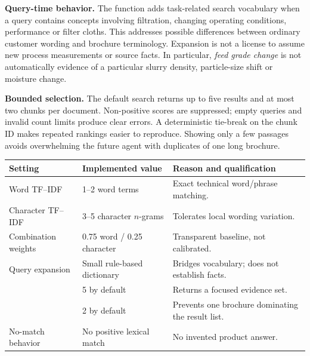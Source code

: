 \documentclass[11pt,a4paper]{article}
\DeclareRobustCommand{\code}[1]{{\ttfamily\small\detokenize{#1}}}
\begin{document}
\textbf{Query-time behavior.} The function \code{expand_query()} adds task-related search vocabulary when a query contains concepts involving filtration, changing operating conditions, performance or filter cloths. This addresses possible differences between ordinary customer wording and brochure terminology. Expansion is not a license to assume new process measurements or source facts. In particular, \emph{feed grade change} is not automatically evidence of a particular slurry density, particle-size shift or moisture change.

\textbf{Bounded selection.} The default search returns up to five results and at most two chunks per document. Non-positive scores are suppressed; empty queries and invalid count limits produce clear errors. A deterministic tie-break on the chunk ID makes repeated rankings easier to reproduce. Showing only a few passages avoids overwhelming the future agent with duplicates of one long brochure.

\begin{tabularx}{\textwidth}{@{}L{45mm}L{43mm}Y@{}}
\toprule\textbf{Setting} & \textbf{Implemented value} & \textbf{Reason and qualification}\\\midrule
Word TF--IDF & 1--2 word terms & Exact technical word/phrase matching.\\
Character TF--IDF & 3--5 character \(n\)-grams & Tolerates local wording variation.\\
Combination weights & 0.75 word / 0.25 character & Transparent baseline, not calibrated.\\
Query expansion & Small rule-based dictionary & Bridges vocabulary; does not establish facts.\\
\code{top_k} & 5 by default & Returns a focused evidence set.\\
\code{max_per_document} & 2 by default & Prevents one brochure dominating the result list.\\
No-match behavior & No positive lexical match & No invented product answer.\\
\bottomrule
\end{tabularx}
\end{document}
